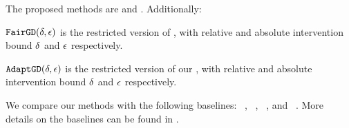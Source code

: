 \documentclass[sigconf, anonymous, review]{acmart}
\begin{document}
The proposed methods are \fairgd and \crossgd. Additionally:

\vspace{1mm}
\noindent 
${\texttt{FairGD}}(\delta,\epsilon)$  is the restricted version of \fairgd, 
with relative and absolute intervention bound $\delta$ and $\epsilon$ respectively.

\vspace{1mm}
\noindent 
${\texttt{AdaptGD}}(\delta,\epsilon)$ is the restricted version of our \crossgd, 
with relative and absolute intervention bound $\delta$ and $\epsilon$ respectively.

\vspace{1mm}
\noindent 
We compare our methods with the following baselines:
\lfpru~\citep{tsioutsiouliklis_fairness-aware_2021},
\lfprn~\citep{tsioutsiouliklis_fairness-aware_2021},
\fairwalk~\citep{rahman_fairwalk_2019}, and
\crosswalk~\citep{khajehnejad_crosswalk_2022}.
More details on the baselines
can be found in 
.

\end{document}
